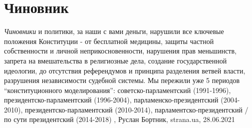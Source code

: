  
 
 
 
 
\chapter{Чиновник}

\emph{Чиновники} и политики, за наши с вами деньги, нарушили все ключевые положения
Конституции - от бесплатной медицины, защиты частной собственности и личной
неприкосновенности, нарушения прав меньшинств, запрета на вмешательства в
религиозные дела, создание государственной идеологии, до отсутствия
референдумов и принципа разделения ветвей власти, разрушения независимости
судебной системы.  Мы пережили уже 5 периодов \enquote{конституционного моделирования}:
советско-парламентский (1991-1996), президентско-парламентский (1996-2004),
парламенско-президентский (2004-2010), президентско-парламентский (2010-2014),
парламентско-президентский / по сути президентский (2014-2018)
, 
Руслан Бортник, strana.ua, 28.06.2021
